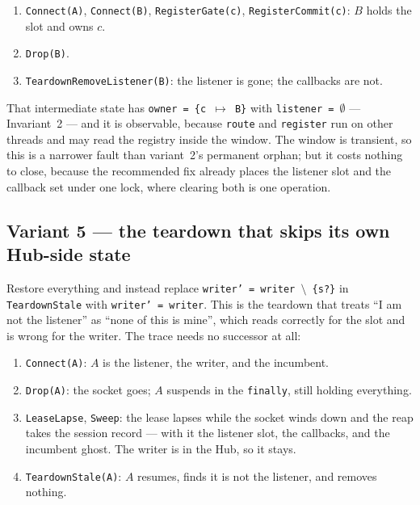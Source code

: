 \documentclass[a4paper,10pt,fleqn]{article}
\begin{document}
\begin{enumerate}
  \item \texttt{Connect(A)}, \texttt{Connect(B)},
    \texttt{RegisterGate(c)}, \texttt{RegisterCommit(c)}: $B$ holds the
    slot and owns $c$.
  \item \texttt{Drop(B)}.
  \item \texttt{TeardownRemoveListener(B)}: the listener is gone; the
    callbacks are not.
\end{enumerate}

That intermediate state has \texttt{owner = \{c $\mapsto$ B\}} with
\texttt{listener = $\emptyset$} --- Invariant~2 --- and it is observable,
because \texttt{route} and \texttt{register} run on other threads and
may read the registry inside the window.  The window is transient, so
this is a narrower fault than variant~2's permanent orphan; but it costs
nothing to close, because the recommended fix already places the
listener slot and the callback set under one lock, where clearing both
is one operation.

\subsection*{Variant 5 --- the teardown that skips its own Hub-side state}

Restore everything and instead replace \texttt{writer' = writer
$\setminus$ \{s?\}} in \texttt{TeardownStale} with \texttt{writer' =
writer}.  This is the teardown that treats ``I am not the listener'' as
``none of this is mine'', which reads correctly for the slot and is
wrong for the writer.  The trace needs no successor at all:

\begin{enumerate}
  \item \texttt{Connect(A)}: $A$ is the listener, the writer, and the
    incumbent.
  \item \texttt{Drop(A)}: the socket goes; $A$ suspends in the
    \texttt{finally}, still holding everything.
  \item \texttt{LeaseLapse}, \texttt{Sweep}: the lease lapses while the
    socket winds down and the reap takes the session record --- with it
    the listener slot, the callbacks, and the incumbent ghost.  The
    writer is in the Hub, so it stays.
  \item \texttt{TeardownStale(A)}: $A$ resumes, finds it is not the
    listener, and removes nothing.
\end{enumerate}
\end{document}
